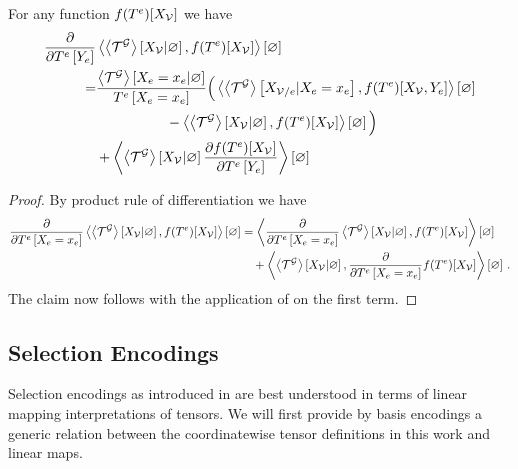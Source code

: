 \begin{lemma}\label{lem:difMNExpectation}
	For any function $f(T^{e})[X_{\mathcal{V}}]$ we have
	\begin{align*}
		 \frac{\partial }{\partial T^{e}\left[Y_{e}\right]} &
		\left\langle \left\langle \mathcal{T}^{\mathcal{G}}\right\rangle \left[ X_{\mathcal{V}} | \varnothing \right],f(T^{e})[X_{\mathcal{V}}]\right\rangle \left[ \varnothing \right] \\
		= & 
		\frac{\left\langle \mathcal{T}^{\mathcal{G}}\right\rangle \left[ X_{e}=x_{e} | \varnothing \right]}{T^{e}\left[X_{e}=x_{e}\right]} 
		\Big( \left\langle \left\langle \mathcal{T}^{\mathcal{G}}\right\rangle \left[ X_{\mathcal{V}/e} | X_{e}=x_{e} \right], f(T^{e})[X_{\mathcal{V}},Y_{e}]\right\rangle \left[ \varnothing \right] \\
		& \quad \quad \quad \quad \quad - \left\langle \left\langle \mathcal{T}^{\mathcal{G}}\right\rangle \left[ X_{\mathcal{V}} | \varnothing \right], f(T^{e})[X_{\mathcal{V}}]\right\rangle \left[ \varnothing \right]
		\Big) \\
		& + \left\langle  \left\langle \mathcal{T}^{\mathcal{G}}\right\rangle \left[ X_{\mathcal{V}} | \varnothing \right]
		\frac{\partial f(T^{e})[X_{\mathcal{V}}]}{\partial T^{e}\left[Y_{e}\right]}
		\right\rangle \left[ \varnothing \right]
	\end{align*}
\end{lemma}
\begin{proof}
	By product rule of differentiation we have
	\begin{align*}
		\frac{\partial }{\partial T^{e}\left[X_{e}=x_{e}\right]} \left\langle \left\langle \mathcal{T}^{\mathcal{G}}\right\rangle \left[ X_{\mathcal{V}} | \varnothing \right],f(T^{e})[X_{\mathcal{V}}]\right\rangle \left[ \varnothing \right] 
		& =  \left\langle \frac{\partial }{\partial T^{e}\left[X_{e}=x_{e}\right]}\left\langle \mathcal{T}^{\mathcal{G}}\right\rangle \left[ X_{\mathcal{V}} | \varnothing \right],f(T^{e})[X_{\mathcal{V}}]\right\rangle \left[ \varnothing \right] \\
		& \quad +  \left\langle \left\langle \mathcal{T}^{\mathcal{G}}\right\rangle \left[ X_{\mathcal{V}} | \varnothing \right],\frac{\partial }{\partial T^{e}\left[X_{e}=x_{e}\right]}f(T^{e})[X_{\mathcal{V}}]\right\rangle \left[ \varnothing \right]  \, . 
	\end{align*}
	The claim now follows with the application of  on the first term.
\end{proof}






\subsection{Selection Encodings}

Selection encodings as introduced in  are best understood in terms of linear mapping interpretations of tensors.
We will first provide by basis encodings a generic relation between the coordinatewise tensor definitions in this work and linear maps.

